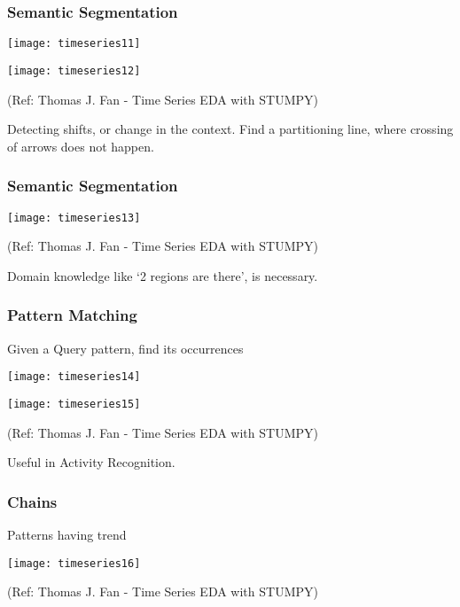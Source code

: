 \begin{frame}[fragile]\frametitle{Semantic Segmentation}

\begin{center}
\texttt{[image: timeseries11]}

\texttt{[image: timeseries12]}


{\tiny (Ref: Thomas J. Fan - Time Series EDA with STUMPY)}		
\end{center}

Detecting shifts, or change in the context. Find a partitioning line, where crossing of arrows does not happen.
\end{frame}

\begin{frame}[fragile]\frametitle{Semantic Segmentation}

\begin{center}
\texttt{[image: timeseries13]}

{\tiny (Ref: Thomas J. Fan - Time Series EDA with STUMPY)}		
\end{center}

Domain knowledge like `2 regions are there', is necessary.
\end{frame}

\begin{frame}[fragile]\frametitle{Pattern Matching}

Given a Query pattern, find its occurrences

\begin{center}
\texttt{[image: timeseries14]}

\texttt{[image: timeseries15]}

{\tiny (Ref: Thomas J. Fan - Time Series EDA with STUMPY)}		
\end{center}

Useful in Activity Recognition.

\end{frame}

\begin{frame}[fragile]\frametitle{Chains}

Patterns having trend

\begin{center}
\texttt{[image: timeseries16]}

{\tiny (Ref: Thomas J. Fan - Time Series EDA with STUMPY)}		
\end{center}

\end{frame}

